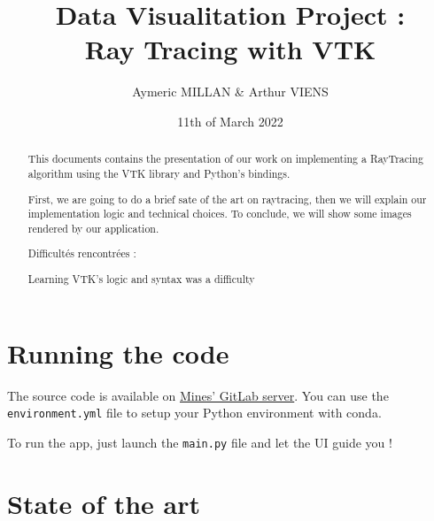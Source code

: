 \documentclass[10pt,twocolumn,letterpaper]{article}
\title{
		\huge Data Visualitation Project :\\ Ray Tracing with VTK \\
}
\author{Aymeric MILLAN \& Arthur VIENS}
\affil{Lecture given by Julien Wintz}
\date{11th of March 2022}
\def\code#1{\texttt{#1}}
\begin{document}
\setlength\headheight{26pt}

\maketitle

\thispagestyle{firstpage}
\begin{abstract}
This documents contains the presentation of our work on implementing a
RayTracing algorithm using the VTK library and Python's bindings.

First, we are going to do a brief sate of the art on raytracing, then we will
explain our implementation logic and technical choices. To conclude, we will
show some images rendered by our application.

Difficultés rencontrées :

Learning VTK's logic and syntax was a difficulty

\end{abstract}

\section{Running the code}
The source code is available on
\href{https://git.sophia.mines-paristech.fr/aymeric.millan/visu-raytracing}{Mines' GitLab server}.
You can use the \code{environment.yml} file to setup your Python environment
with conda.

To run the app, just launch the \code{main.py} file and let the UI guide you !

\section{State of the art}
\end{document}
